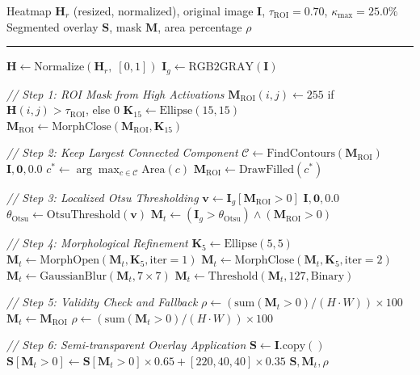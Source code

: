 \documentclass[journal,twoside]{IEEEtran}
\begin{document}
\begin{algorithm}
\caption{Grad-CAM Guided Morphological Tumor Segmentation}
\label{alg:segmentation}
\begin{algorithmic}[1]
\REQUIRE Heatmap $\mathbf{H}_r$ (resized, normalized), original image $\mathbf{I}$, $\tau_\text{ROI}=0.70$, $\kappa_\text{max}=25.0\%$
\ENSURE Segmented overlay $\mathbf{S}$, mask $\mathbf{M}$, area percentage $\rho$
\hrule
\medskip
\STATE $\mathbf{H} \leftarrow \text{Normalize}(\mathbf{H}_r,\; [0,1])$
\STATE $\mathbf{I}_g \leftarrow \text{RGB2GRAY}(\mathbf{I})$

\textit{// Step 1: ROI Mask from High Activations}
\STATE $\mathbf{M}_\text{ROI}(i,j) \leftarrow 255$ if $\mathbf{H}(i,j) > \tau_\text{ROI}$, else $0$
\STATE $\mathbf{K}_{15} \leftarrow \text{Ellipse}(15, 15)$
\STATE $\mathbf{M}_\text{ROI} \leftarrow \text{MorphClose}(\mathbf{M}_\text{ROI}, \mathbf{K}_{15})$

\textit{// Step 2: Keep Largest Connected Component}
\STATE $\mathcal{C} \leftarrow \text{FindContours}(\mathbf{M}_\text{ROI})$
   \RETURN $\mathbf{I}, \mathbf{0}, 0.0$ 
\ENDIF
\STATE $c^* \leftarrow \arg\max_{c \in \mathcal{C}} \text{Area}(c)$
\STATE $\mathbf{M}_\text{ROI} \leftarrow \text{DrawFilled}(c^*)$

\textit{// Step 3: Localized Otsu Thresholding}
\STATE $\mathbf{v} \leftarrow \mathbf{I}_g[\mathbf{M}_\text{ROI} > 0]$
   \RETURN $\mathbf{I}, \mathbf{0}, 0.0$
\ENDIF
\STATE $\theta_\text{Otsu} \leftarrow \text{OtsuThreshold}(\mathbf{v})$
\STATE $\mathbf{M}_t \leftarrow (\mathbf{I}_g > \theta_\text{Otsu}) \wedge (\mathbf{M}_\text{ROI} > 0)$

\textit{// Step 4: Morphological Refinement}
\STATE $\mathbf{K}_5 \leftarrow \text{Ellipse}(5,5)$
\STATE $\mathbf{M}_t \leftarrow \text{MorphOpen}(\mathbf{M}_t, \mathbf{K}_5, \text{iter}=1)$
\STATE $\mathbf{M}_t \leftarrow \text{MorphClose}(\mathbf{M}_t, \mathbf{K}_5, \text{iter}=2)$
\STATE $\mathbf{M}_t \leftarrow \text{GaussianBlur}(\mathbf{M}_t, 7\times7)$
\STATE $\mathbf{M}_t \leftarrow \text{Threshold}(\mathbf{M}_t, 127, \text{Binary})$

\textit{// Step 5: Validity Check and Fallback}
\STATE $\rho \leftarrow (\text{sum}(\mathbf{M}_t > 0) / (H \cdot W)) \times 100$
   \STATE $\mathbf{M}_t \leftarrow \mathbf{M}_\text{ROI}$
   \STATE $\rho \leftarrow (\text{sum}(\mathbf{M}_t>0)/(H \cdot W))\times100$
\ENDIF

\textit{// Step 6: Semi-transparent Overlay Application}
\STATE $\mathbf{S} \leftarrow \mathbf{I}.\text{copy}()$
\STATE $\mathbf{S}[\mathbf{M}_t > 0] \leftarrow \mathbf{S}[\mathbf{M}_t > 0] \times 0.65 + [220, 40, 40] \times 0.35$
\RETURN $\mathbf{S}, \mathbf{M}_t, \rho$
\end{algorithmic}
\end{algorithm}
\end{document}
